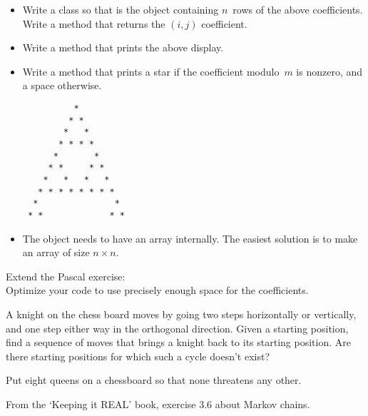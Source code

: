 \begin{exercise}
  \label{ex:pascal-ex}
  \small
  \begin{itemize}
  \item 
    Write a class  so that  is the object
    containing $n$~rows of the above coefficients. Write a method
     that returns the $(i,j)$ coefficient.
  \item
    Write a method  that prints the above display.
  \item
    Write a method  that prints a star if the
    coefficient modulo~$m$ is nonzero, and a space otherwise.
\begin{verbatim}
          *
         * *
        *   *
       * * * *
      *       *
     * *     * *
    *   *   *   *
   * * * * * * * *
  *               *
 * *             * *
\end{verbatim}
  \item
    The object needs to have an array internally. The easiest solution
    is to make an array of size $n\times n$.
  \end{itemize}
\end{exercise}

\begin{exercise}
  \label{ex:pascal-ey}
  Extend the Pascal exercise:\\
  Optimize your code to use
  precisely enough space for the coefficients.
\end{exercise}

\begin{exercise}
  A knight on the chess board moves by going two steps horizontally or
  vertically, and one step either way in the orthogonal
  direction. Given a starting position, find a sequence of moves that
  brings a knight back to its starting position. Are there starting
  positions for which such a cycle doesn't exist?
\end{exercise}

\begin{exercise}
  Put eight queens on a chessboard so that none threatens any other.
\end{exercise}

\begin{exercise}
  From the `Keeping it REAL' book, exercise 3.6 about Markov chains.
\end{exercise}
